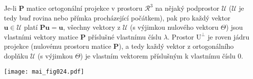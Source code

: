 
\begin{example}\label{mai:exam012}
  Je-li \(\mathbf{P}\) matice ortogonální projekce v prostoru \(\mathcal{R}^3\) na nějaký 
  podprostor \(\mathcal{U}\) (\(\mathcal{U}\) je tedy buď rovina nebo přímka procházející 
  počátkem), pak pro každý vektor \(\mathbf{u}\in\mathcal{U}\) platí \(\mathbf{Pu} = 
  \mathbf{u}\), všechny vektory z \(\mathcal{U}\) (s výjimkou nulového vektoru \(\Theta\)) 
  jsou vlastními vektory matice $\mathbf{P}$ příslušné vlastnímu číslu \(\lambda\). Prostor 
  \(\mathrm{U}^\bot\) je roven jádru projekce (nulovému prostoru matice \(\mathbf{P}\)), 
  a tedy každý vektor z ortogonálního doplňku \(\mathcal{U}\) (s výjimkou \(\Theta\)) je 
  vlastním vektorem příslušným k vlastnímu číslu \(0\).

  {\centering
    \captionsetup{type=figure}
    \texttt{[image: mai\_fig024.pdf]}
    \label{MAI:FIG016}
    \par}
\end{example}